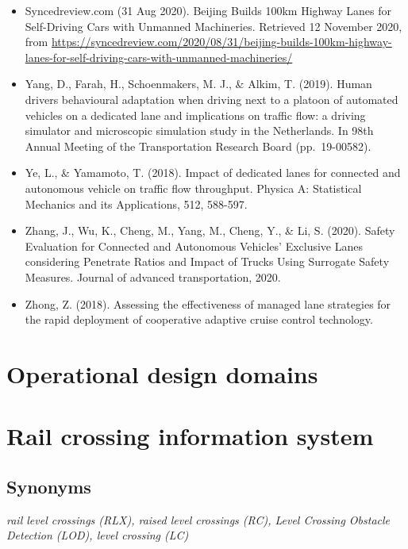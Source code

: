 \documentclass[
]{book}
\begin{document}
\begin{itemize}
\item
  Syncedreview.com (31 Aug 2020). Beijing Builds 100km Highway Lanes for Self-Driving Cars with Unmanned Machineries. Retrieved 12 November 2020, from \url{https://syncedreview.com/2020/08/31/beijing-builds-100km-highway-lanes-for-self-driving-cars-with-unmanned-machineries/}
\item
  Yang, D., Farah, H., Schoenmakers, M. J., \& Alkim, T. (2019). Human drivers behavioural adaptation when driving next to a platoon of automated vehicles on a dedicated lane and implications on traffic flow: a driving simulator and microscopic simulation study in the Netherlands. In 98th Annual Meeting of the Transportation Research Board (pp.~19-00582).
\item
  Ye, L., \& Yamamoto, T. (2018). Impact of dedicated lanes for connected and autonomous vehicle on traffic flow throughput. Physica A: Statistical Mechanics and its Applications, 512, 588-597.
\item
  Zhang, J., Wu, K., Cheng, M., Yang, M., Cheng, Y., \& Li, S. (2020). Safety Evaluation for Connected and Autonomous Vehicles' Exclusive Lanes considering Penetrate Ratios and Impact of Trucks Using Surrogate Safety Measures. Journal of advanced transportation, 2020.
\item
  Zhong, Z. (2018). Assessing the effectiveness of managed lane strategies for the rapid deployment of cooperative adaptive cruise control technology.
\end{itemize}

\hypertarget{ODD}{%
\section{Operational design domains}\label{ODD}}

\hypertarget{rail_crossing_info_system}{%
\section{Rail crossing information system}\label{rail_crossing_info_system}}

\hypertarget{synonyms-1}{%
\subsection*{Synonyms}\label{synonyms-1}}

\emph{rail level crossings (RLX), raised level crossings (RC), Level Crossing Obstacle Detection (LOD), level crossing (LC)}
\end{document}
